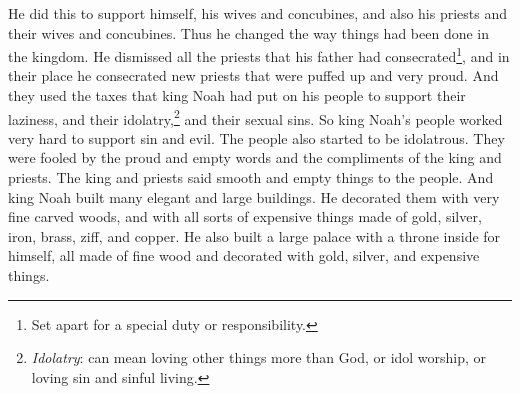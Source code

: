 \bverse \iffalse And all this did he take to support himself, and his wives and his concubines; and also his priests, and their wives and their concubines; thus he had changed the affairs of the kingdom. \fi
He did this to support himself, his wives and concubines, and also his priests and their wives and concubines. Thus he changed the way things had been done in the kingdom.
\bverse \iffalse For he put down all the priests that had been consecrated by his father, and consecrated new ones in their stead, such as were lifted up in the pride of their hearts. \fi
He dismissed all the priests that his father had consecrated\footnote{Set apart for a special duty or responsibility.}, and in their place he consecrated new priests that were puffed up and very proud.
\bverse \iffalse Yea, and thus they were supported in their laziness, and in their idolatry, and in their whoredoms, by the taxes which king Noah had put upon his people; thus did the people labor exceedingly to support iniquity. \fi
And they used the taxes that king Noah had put on his people to support their laziness, and their idolatry,\footnote{\textit{Idolatry}: can mean loving other things more than God, or idol worship, or loving sin and sinful living.} and their sexual sins. So king Noah's people worked very hard to support sin and evil.
\bverse \iffalse Yea, and they also became idolatrous, because they were deceived by the vain and flattering words of the king and priests; for they did speak flattering things unto them. \fi
The people also started to be idolatrous. They were fooled by the proud and empty words and the compliments of the king and priests. The king and priests said smooth and empty things to the people.
\bverse \iffalse And it came to pass that king Noah built many elegant and spacious buildings; and he ornamented them with fine work of wood, and of all manner of precious things, of gold, and of silver, and of iron, and of brass, and of ziff, and of copper; \fi
And king Noah built many elegant and large buildings. He decorated them with very fine carved woods, and with all sorts of expensive things made of gold, silver, iron, brass, ziff, and copper.
\bverse \iffalse And he also built him a spacious palace, and a throne in the midst thereof, all of which was of fine wood and was ornamented with gold and silver and with precious things. \fi
He also built a large palace with a throne inside for himself, all made of fine wood and decorated with gold, silver, and expensive things.
\bverse \iffalse And he also caused that his workmen should work all manner of fine work within the walls of the temple, of fine wood, and of copper, and of brass. \fi
